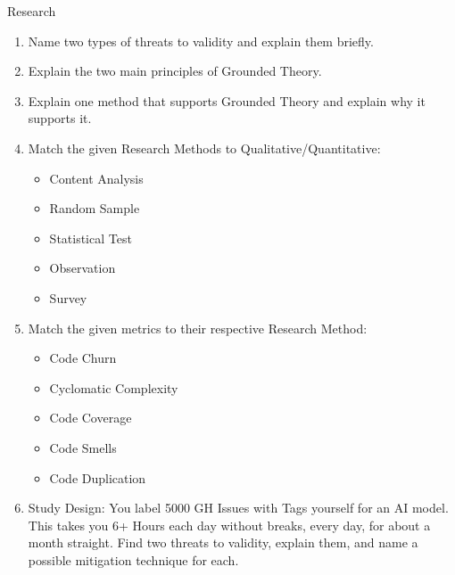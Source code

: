 \documentclass{article}
\author{Leopold Lemmermann}
\begin{document}
\createtitle


\begin{exercise}{Research}
  \begin{enumerate}
    \item Name two types of threats to validity and explain them briefly.
    \item Explain the two main principles of Grounded Theory.
    \item Explain one method that supports Grounded Theory and explain why it supports it.
    \item Match the given Research Methods to Qualitative/Quantitative: 
      \begin{itemize}
        \item Content Analysis
        \item Random Sample
        \item Statistical Test
        \item Observation
        \item Survey
      \end{itemize}
    \item Match the given metrics to their respective Research Method:
      \begin{itemize}
        \item Code Churn
        \item Cyclomatic Complexity
        \item Code Coverage
        \item Code Smells
        \item Code Duplication
      \end{itemize}
    \item Study Design: You label 5000 GH Issues with Tags yourself for an AI model. This takes you 6+ Hours each day without breaks, every day, for about a month straight. Find two threats to validity, explain them, and name a possible mitigation technique for each.
  \end{enumerate}

  \begin{solution}
  
  \end{solution}
\end{exercise}
\end{document}
